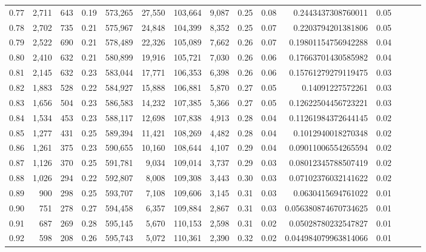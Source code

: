 \begin{tabular}{rrrrrrrrrrrrrrr}
0.77 &   2,711 &    643 &  0.19 &  573,265 &   27,550 &  103,664 &    9,087 &  0.25 &  0.08 &    0.2443437308760011 &      0.05 \\
0.78 &   2,702 &    735 &  0.21 &  575,967 &   24,848 &  104,399 &    8,352 &  0.25 &  0.07 &    0.2203794201381806 &      0.05 \\
0.79 &   2,522 &    690 &  0.21 &  578,489 &   22,326 &  105,089 &    7,662 &  0.26 &  0.07 &   0.19801154756942288 &      0.04 \\
0.80 &   2,410 &    632 &  0.21 &  580,899 &   19,916 &  105,721 &    7,030 &  0.26 &  0.06 &   0.17663701430585982 &      0.04 \\
0.81 &   2,145 &    632 &  0.23 &  583,044 &   17,771 &  106,353 &    6,398 &  0.26 &  0.06 &   0.15761279279119475 &      0.03 \\
0.82 &   1,883 &    528 &  0.22 &  584,927 &   15,888 &  106,881 &    5,870 &  0.27 &  0.05 &      0.14091227572261 &      0.03 \\
0.83 &   1,656 &    504 &  0.23 &  586,583 &   14,232 &  107,385 &    5,366 &  0.27 &  0.05 &   0.12622504456723221 &      0.03 \\
0.84 &   1,534 &    453 &  0.23 &  588,117 &   12,698 &  107,838 &    4,913 &  0.28 &  0.04 &   0.11261984372644145 &      0.02 \\
0.85 &   1,277 &    431 &  0.25 &  589,394 &   11,421 &  108,269 &    4,482 &  0.28 &  0.04 &    0.1012940018270348 &      0.02 \\
0.86 &   1,261 &    375 &  0.23 &  590,655 &   10,160 &  108,644 &    4,107 &  0.29 &  0.04 &   0.09011006554265594 &      0.02 \\
0.87 &   1,126 &    370 &  0.25 &  591,781 &    9,034 &  109,014 &    3,737 &  0.29 &  0.03 &   0.08012345788507419 &      0.02 \\
0.88 &   1,026 &    294 &  0.22 &  592,807 &    8,008 &  109,308 &    3,443 &  0.30 &  0.03 &   0.07102376032141622 &      0.02 \\
0.89 &     900 &    298 &  0.25 &  593,707 &    7,108 &  109,606 &    3,145 &  0.31 &  0.03 &    0.0630415694761022 &      0.01 \\
0.90 &     751 &    278 &  0.27 &  594,458 &    6,357 &  109,884 &    2,867 &  0.31 &  0.03 &  0.056380874670734625 &      0.01 \\
0.91 &     687 &    269 &  0.28 &  595,145 &    5,670 &  110,153 &    2,598 &  0.31 &  0.02 &   0.05028780232547827 &      0.01 \\
0.92 &     598 &    208 &  0.26 &  595,743 &    5,072 &  110,361 &    2,390 &  0.32 &  0.02 &  0.044984079963814066 &      0.01 \\

\end{tabular}
